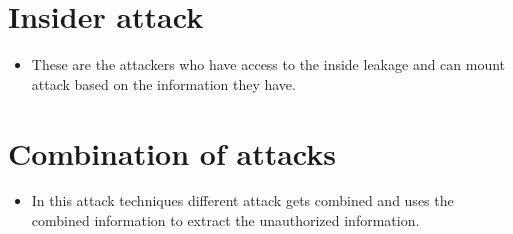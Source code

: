 \section{Insider attack}
\begin{itemize}
    \item These are the attackers who have access to the inside leakage and can mount attack based on the information they have.
\end{itemize}

\section{Combination of attacks}
\begin{itemize}
    \item In this attack techniques different attack gets combined and uses the combined information to extract the unauthorized information.
\end{itemize}

